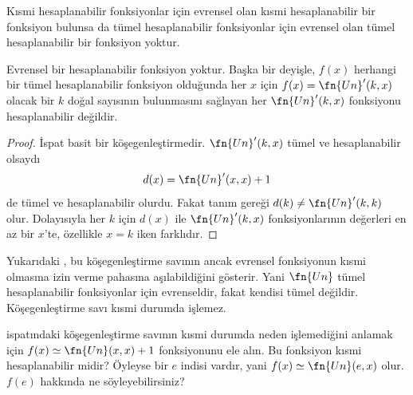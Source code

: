 


Kısmi hesaplanabilir fonksiyonlar için evrensel olan kısmi hesaplanabilir bir
fonksiyon bulunsa da tümel hesaplanabilir fonksiyonlar için evrensel olan
tümel hesaplanabilir bir fonksiyon yoktur.

\begin{thm}
Evrensel bir hesaplanabilir fonksiyon yoktur. Başka bir deyişle, $f(x)$
herhangi bir tümel hesaplanabilir fonksiyon olduğunda her $x$ için
$f(x)=\fn{Un}'(k,x)$ olacak bir $k$ doğal sayısının bulunmasını sağlayan
her $\fn{Un}'(k,x)$ fonksiyonu hesaplanabilir değildir.
\end{thm}

\begin{proof}
İspat basit bir köşegenleştirmedir. $\fn{Un}'(k,x)$ tümel ve hesaplanabilir
olsaydı
\[
  d(x)=\fn{Un}'(x,x)+1
\]
de tümel ve hesaplanabilir olurdu. Fakat tanım gereği
$d(k)\neq\fn{Un}'(k,k)$ olur. Dolayısıyla her $k$ için $d(x)$ ile
$\fn{Un}'(k,x)$ fonksiyonlarının değerleri en az bir $x$'te, özellikle
$x=k$ iken farklıdır.
\end{proof}

\begin{explain}
Yukarıdaki , bu köşegenleştirme savının ancak
evrensel fonksiyonun kısmi olmasına izin verme pahasına aşılabildiğini
gösterir. Yani $\fn{Un}$ tümel hesaplanabilir fonksiyonlar için evrenseldir,
fakat kendisi tümel değildir. Köşegenleştirme savı kısmi durumda işlemez.
\end{explain}

\begin{prob}
   ispatındaki köşegenleştirme savının kısmi durumda neden
  işlemediğini anlamak için $f(x)\simeq\fn{Un}(x,x)+1$ fonksiyonunu ele alın.
  Bu fonksiyon kısmi hesaplanabilir midir? Öyleyse bir $e$ indisi vardır,
  yani $f(x)\simeq\fn{Un}(e,x)$ olur. $f(e)$ hakkında ne söyleyebilirsiniz?
\end{prob}

